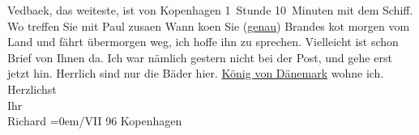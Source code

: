 \begin{ledgroupsized}[t]{13cm}
           \pstart
           {\pb}Vedbaek, das weiteste, ist von Kopenhagen 1 Stunde 10 Minuten mit dem Schiff.
               Wo treffen Sie mit Paul zusa{\geminationm}en\pend
           \pstart
           Wann ko{\geminationm}en Sie (\uline{genau})\pend
           \pstart
           Brandes ko{\geminationm}t
               morgen vom Land und fährt übermorgen weg, ich hoffe ihn zu sprechen. Vielleicht ist
               schon Brief von Ihnen da. {\pb}Ich war
               nämlich gestern nicht bei der Post, und gehe erst jetzt hin. Herrlich sind nur die
               Bäder hier. \uline{König von Dänemark} wohne ich.\pend
           \pstart
           Herzlichst{\\[\baselineskip]}Ihr{\\[\baselineskip]}\spacefill\mbox{Richard}\pend
           \leftskip=0em{}/VII 96{ }Kopenhagen\pend
           
         
         \endnumbering{}\end{ledgroupsized}  \newcommand{\dateiname}{L00570}\newcommand{\titel}{Richard Beer-Hofmann an Arthur Schnitzler, 28. 7. 1896}\newcommand{\editorInnen}{Martin Anton Müller und Gerd-Hermann Susen}
      